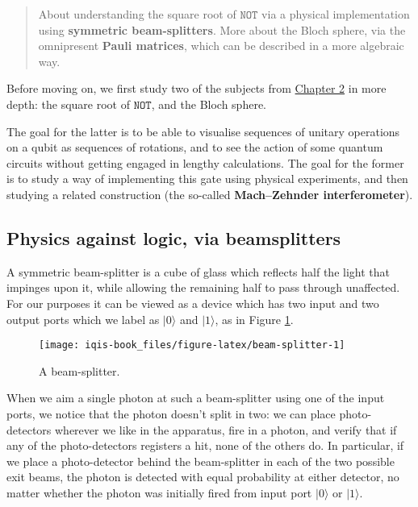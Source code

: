 \documentclass[fleqn]{article}
\begin{document}
\begin{quote}
About understanding the square root of \(\texttt{NOT}\) via a physical implementation using \textbf{symmetric beam-splitters}.
More about the Bloch sphere, via the omnipresent \textbf{Pauli matrices}, which can be described in a more algebraic way.
\end{quote}

Before moving on, we first study two of the subjects from \protect\hyperlink{chapter2}{Chapter 2} in more depth: the square root of \(\texttt{NOT}\), and the Bloch sphere.

The goal for the latter is to be able to visualise sequences of unitary operations on a qubit as sequences of rotations, and to see the action of some quantum circuits without getting engaged in lengthy calculations.
The goal for the former is to study a way of implementing this gate using physical experiments, and then studying a related construction (the so-called \textbf{Mach--Zehnder interferometer}).

\hypertarget{physics-against-logic-via-beamsplitters}{%
\subsection{Physics against logic, via beamsplitters}\label{physics-against-logic-via-beamsplitters}}

A symmetric beam-splitter is a cube of glass which reflects half the light that impinges upon it, while allowing the remaining half to pass through unaffected.
For our purposes it can be viewed as a device which has two input and two output ports which we label as \(|0\rangle\) and \(|1\rangle\), as in Figure \ref{fig:beam-splitter}.

\begin{figure}[H]

{\centering \texttt{[image: iqis-book\_files/figure-latex/beam-splitter-1]} 

}

\caption{A beam-splitter.}\label{fig:beam-splitter}
\end{figure}

When we aim a single photon at such a beam-splitter using one of the input ports, we notice that the photon doesn't split in two: we can place photo-detectors wherever we like in the apparatus, fire in a photon, and verify that if any of the photo-detectors registers a hit, none of the others do.
In particular, if we place a photo-detector behind the beam-splitter in each of the two possible exit beams, the photon is detected with equal probability at either detector, no matter whether the photon was initially fired from input port \(|0\rangle\) or \(|1\rangle\).
\end{document}
